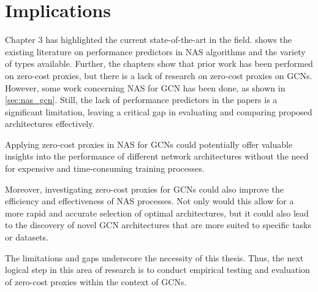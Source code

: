 \section{Implications}

Chapter 3 has highlighted the current state-of-the-art in the field.  shows the existing literature on performance predictors in NAS algorithms and the variety of types available. Further, the chapters show that prior work has been performed on zero-cost proxies, but there is a lack of research on zero-cost proxies on GCNs. However, some work concerning NAS for GCN has been done, as shown in \cref{sec:nas_gcn}. Still, the lack of performance predictors in the papers is a significant limitation, leaving a critical gap in evaluating and comparing proposed architectures effectively. 

Applying zero-cost proxies in NAS for GCNs could potentially offer valuable insights into the performance of different network architectures without the need for expensive and time-consuming training processes.

Moreover, investigating zero-cost proxies for GCNs could also improve the efficiency and effectiveness of NAS processes. Not only would this allow for a more rapid and accurate selection of optimal architectures, but it could also lead to the discovery of novel GCN architectures that are more suited to specific tasks or datasets.

The limitations and gaps underscore the necessity of this thesis. Thus, the next logical step in this area of research is to conduct empirical testing and evaluation of zero-cost proxies within the context of GCNs.
